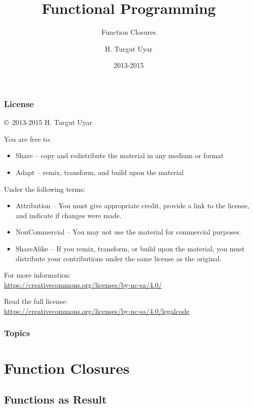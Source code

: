 \documentclass[dvipsnames]{beamer}
\title{Functional Programming}
\subtitle{Function Closures}
\author{H. Turgut Uyar}
\date{2013-2015}
\theoremstyle{plain}
\begin{document}
\begin{frame}
  \titlepage
\end{frame}

\begin{frame}
  \frametitle{License}

  \hfill
  \copyright~2013-2015 H. Turgut Uyar

  \vfill
  \begin{footnotesize}
    You are free to:
    \begin{itemize}
      \itemsep0em
      \item Share -- copy and redistribute the material in any medium or format
      \item Adapt -- remix, transform, and build upon the material
    \end{itemize}

    Under the following terms:
    \begin{itemize}
      \itemsep0em
      \item Attribution -- You must give appropriate credit, provide a link to
        the license, and indicate if changes were made.

      \item NonCommercial -- You may not use the material for commercial
        purposes.

      \item ShareAlike -- If you remix, transform, or build upon the material,
        you must distribute your contributions under the same license as the
        original.
    \end{itemize}

    For more information:\\
    \url{https://creativecommons.org/licenses/by-nc-sa/4.0/}

    \smallskip
    Read the full license:\\
    \url{https://creativecommons.org/licenses/by-nc-sa/4.0/legalcode}
  \end{footnotesize}
\end{frame}

\begin{frame}
  \frametitle{Topics}
  \tableofcontents
\end{frame}

\section{Function Closures}

\subsection{Functions as Result}
\end{document}
